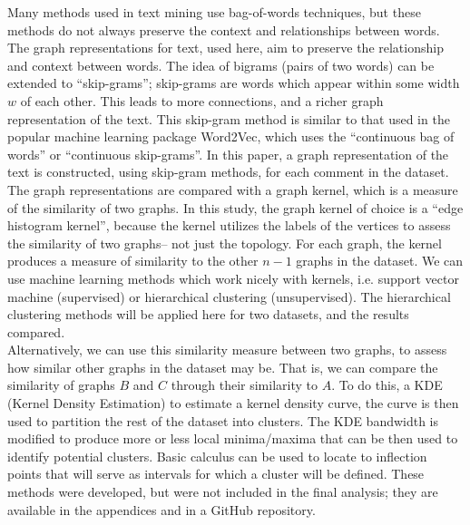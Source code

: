 Many methods used in text mining use bag-of-words techniques, but these methods do not always preserve the context and relationships between words. The graph representations for text, used here, aim to preserve the relationship and context between words. The idea of bigrams (pairs of two words) can be extended to ``skip-grams”; skip-grams are words which appear within some width $w$ of each other. This leads to more connections, and a richer graph representation of the text. This skip-gram method is similar to that used in the popular machine learning package Word2Vec, which uses the “continuous bag of words” or ``continuous skip-grams”. In this paper, a graph representation of the text is constructed, using skip-gram methods, for each comment in the dataset. \\
The graph representations are compared with a graph kernel, which is a measure of the similarity of two graphs. In this study, the graph kernel of choice is a ``edge histogram kernel”, because the kernel utilizes the labels of the vertices to assess the similarity of two graphs– not just the topology. For each graph, the kernel produces a measure of similarity to the other $n-1$ graphs in the dataset. We can use machine learning methods which work nicely with kernels, i.e. support vector machine (supervised) or hierarchical clustering (unsupervised). The hierarchical clustering methods will be applied here for two datasets, and the results compared.\\
Alternatively, we can use this similarity measure between two graphs, to assess how similar other graphs in the dataset may be. That is, we can compare the similarity of graphs $B$ and $C$ through their similarity to $A$. To do this, a KDE (Kernel Density Estimation) to estimate a kernel density curve, the curve is then used to partition the rest of the dataset into clusters. The KDE bandwidth is modified to produce more or less local minima/maxima that can be then used to identify potential clusters. Basic calculus can be used to locate to inflection points that will serve as intervals for which a cluster will be defined. These methods were developed, but were not included in the final analysis; they are available in the appendices and in a GitHub repository. \\
